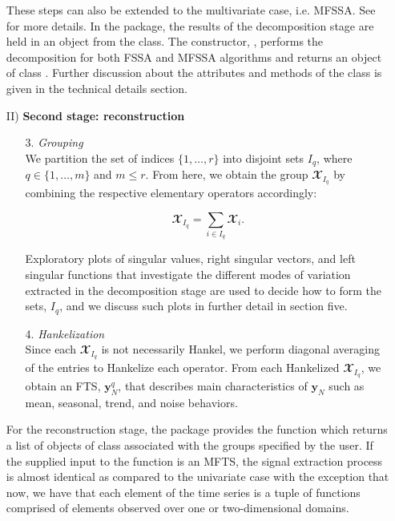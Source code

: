 \begin{itemize}
\begin{itemize}
\end{itemize}

These steps can also be extended to the multivariate case, i.e. MFSSA. See \cite{trinka2022multivariate} for more details. In the  package, the results of the decomposition stage are held in an object from the  class. The constructor, , performs the decomposition for both FSSA and MFSSA algorithms and returns an object of class . Further discussion about the attributes and methods of the  class is given in the technical details section.

\item[II)] \textbf{Second stage: reconstruction}

\begin{itemize}

\item[3.] \textit{Grouping}\\ We partition the set of indices $\{1,\dots,r\}$ into disjoint sets $I_{q}$, where $q \in \{1,\dots, m\}$ and $m\leq r$. From here, we obtain the group $\mathbfcal{X}_{I_{q}}$ by combining the respective elementary operators accordingly:

	\begin{equation}

		\mathbfcal{X}_{I_{q}} = \sum_{i \in I_{q}} \mathbfcal{X}_{i}. \nonumber

	\end{equation}

Exploratory plots of singular values, right singular vectors, and left singular functions that investigate the different modes of variation extracted in the decomposition stage are used to decide how to form the sets, $I_{q}$, and we discuss such plots in further detail in section five.

\item[4.] \textit{Hankelization }\\ Since each $\mathbfcal{X}_{I_{q}}$ is not necessarily Hankel, we perform diagonal averaging of the entries to Hankelize each operator. From each Hankelized $\mathbfcal{X}_{I_{q}}$, we obtain an FTS, $\mathbf{y}_{N}^{q}$, that describes main characteristics of $\mathbf{y}_{N}$ such as mean, seasonal, trend, and noise behaviors.

\end{itemize}

For the reconstruction stage, the  package provides the function  which returns a list of objects of class  associated with the groups specified by the user. If the supplied input to the  function is an MFTS, the signal extraction process is almost identical as compared to the univariate case with the exception that now, we have that each element of the time series is a tuple of functions comprised of elements observed over one or two-dimensional domains.


\end{itemize}
